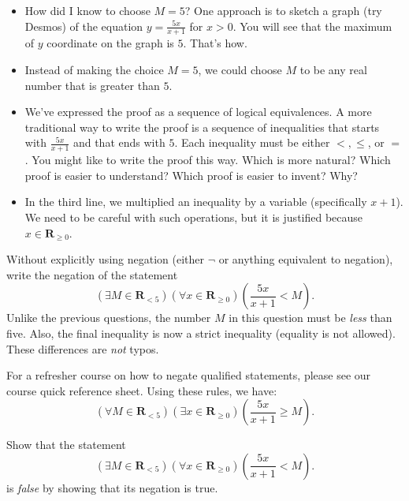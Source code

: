 \documentclass[12pt,fleqn,answers]{exam}
\newcommand{\reals}{\mathbf{R}}
\renewenvironment{solution}
  {\begin{shaded*}} %
  {\end{shaded*}}   %
\begin{document}
\begin{questions}
\begin{solution}
\begin{itemize}
\item How did I know to choose $M = 5$? One approach is to sketch a graph (try Desmos)
of the equation $y = \frac{5 x}{x+1}$ for $x > 0$. You will see that the maximum of 
$y$ coordinate on the graph is $5$. That's how.

\item Instead of making the choice $M = 5$, we could choose $M$ to 
be any real number that is greater than $5$.

\item We've expressed the proof as a sequence of logical equivalences.
 A more traditional way to write the proof is a sequence of inequalities 
that starts with $\frac{5 x}{x+1}$ and that ends with $5$. Each
inequality must be either $<, \leq$, or $=$. You might like to write the
proof this way. Which is more natural? Which proof is easier to understand? 
Which proof is easier to invent?
Why?

\item In the third line, we multiplied an inequality by a variable 
(specifically $x+1$). We need to be careful with such operations, but
it is justified because $x \in \reals_{\geq 0}$.
\end{itemize}
\end{solution}

\question [10]  Without explicitly using negation (either $\lnot$ or anything equivalent to negation), write the negation of the statement
\begin{equation*}
\left(\exists M \in  \reals_{< 5} \right)
\left(\forall x \in  \reals_{\geq 0} \right) \left(\frac{5 x}{x+1} <  M \right).
\end{equation*}
Unlike the previous questions, the number $M$ in this question must be \emph{less} than five. Also,
the final inequality is now a strict inequality (equality is not allowed). These differences are \emph{not} typos.

\begin{solution} For a refresher course on how to negate qualified
  statements, please see our course quick reference sheet. Using these
  rules, we have:
  \begin{equation*}
    \left(\forall M \in  \reals_{< 5} \right)
    \left(\exists x \in  \reals_{\geq 0} \right) 
    \left(\frac{5 x}{x+1} \geq   M \right).
    \end{equation*}  
\end{solution}

\question [10]  Show that the statement 
\begin{equation*}
\left(\exists M \in  \reals_{< 5} \right)
\left(\forall x \in  \reals_{\geq 0} \right) \left(\frac{5 x}{x+1}  < M \right).
\end{equation*}
is \emph{false} by showing that its negation is true.


\end{questions}
\end{document}
